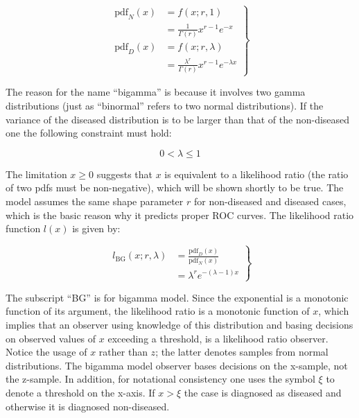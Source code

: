 \documentclass[
]{book}
\begin{document}
\begin{equation}
\left.\begin{aligned}
\text{pdf}_N\left( x \right) &= f\left( x;r,1 \right)\\
&= \frac{1}{\Gamma\left( r \right)}x^{r-1}e^{-x}\\
\text{pdf}_D\left( x \right) &= f\left( x;r,\lambda \right)\\
&= \frac{\lambda^r}{\Gamma\left( r \right)}x^{r-1}e^{-\lambda x} 
\end{aligned}\right\}
\label{eq:proper-roc-models-gamma-pdfs}
\end{equation}

The reason for the name ``bigamma'' is because it involves two gamma distributions (just as ``binormal'' refers to two normal distributions). If the variance of the diseased distribution is to be larger than that of the non-diseased one the following constraint must hold:

\begin{equation}
0 < \lambda \le 1
\label{eq:proper-roc-models-bigamma-lambda-inequality}
\end{equation}

The limitation \(x \ge 0\) suggests that \(x\) is equivalent to a likelihood ratio (the ratio of two pdfs must be non-negative), which will be shown shortly to be true. The model assumes the same shape parameter \(r\) for non-diseased and diseased cases, which is the basic reason why it predicts proper ROC curves. The likelihood ratio function \(l(x)\) is given by:

\begin{equation}
\left.\begin{aligned}
l_\text{BG}\left( x;r,\lambda \right) &= \frac{\text{pdf}_D\left( x \right)}{\text{pdf}_N\left( x \right)} \\
&=\lambda^r e^{-\left( \lambda - 1 \right) x}
\end{aligned}\right\}
\label{eq:proper-roc-models-bigamma-likelihood}
\end{equation}

The subscript ``BG'' is for bigamma model. Since the exponential is a monotonic function of its argument, the likelihood ratio is a monotonic function of \(x\), which implies that an observer using knowledge of this distribution and basing decisions on observed values of \(x\) exceeding a threshold, is a likelihood ratio observer. Notice the usage of \(x\) rather than \(z\); the latter denotes samples from normal distributions. The bigamma model observer bases decisions on the x-sample, not the z-sample. In addition, for notational consistency one uses the symbol \(\xi\) to denote a threshold on the x-axis. If \(x > \xi\) the case is diagnosed as diseased and otherwise it is diagnosed non-diseased.
\end{document}
